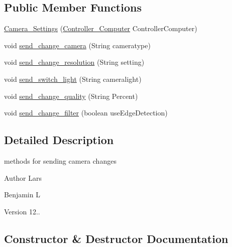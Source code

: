 \subsection*{Public Member Functions}
\begin{DoxyCompactItemize}
\item 
\hyperlink{class_controller_1_1_camera___settings_a9a4ac92cf1492034da3a81d870bc0779}{Camera\+\_\+\+Settings} (\hyperlink{class_controller_1_1_controller___computer}{Controller\+\_\+\+Computer} Controller\+Computer)
\item 
void \hyperlink{class_controller_1_1_camera___settings_a39bba47bcc84835b2af1062b560a521e}{send\+\_\+change\+\_\+camera} (String cameratype)
\item 
void \hyperlink{class_controller_1_1_camera___settings_ad50f0613316fccf38355f44c21b844b8}{send\+\_\+change\+\_\+resolution} (String setting)
\item 
void \hyperlink{class_controller_1_1_camera___settings_aa8a94837c96e3f9c0291b14d921f29bc}{send\+\_\+switch\+\_\+light} (String cameralight)
\item 
void \hyperlink{class_controller_1_1_camera___settings_aefa4a488f63b68e8e867d11c03ecc8c0}{send\+\_\+change\+\_\+quality} (String Percent)
\item 
void \hyperlink{class_controller_1_1_camera___settings_a9d8c0046cda78d43836e47d086a3cd79}{send\+\_\+change\+\_\+filter} (boolean use\+Edge\+Detection)
\end{DoxyCompactItemize}


\subsection{Detailed Description}
methods for sending camera changes \begin{DoxyAuthor}{Author}
Lars 

Benjamin L 
\end{DoxyAuthor}
\begin{DoxyVersion}{Version}
12.. 
\end{DoxyVersion}


\subsection{Constructor \& Destructor Documentation}
\hypertarget{class_controller_1_1_camera___settings_a9a4ac92cf1492034da3a81d870bc0779}{}
